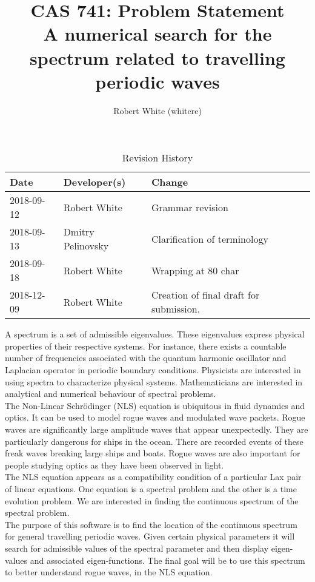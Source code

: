 \documentclass{article}
\title{CAS 741: Problem Statement\\A numerical search for the spectrum related
to travelling periodic waves}
\author{Robert White (whitere)}
\date{}
\begin{document}
\maketitle
\begin{table}[hp]
\caption{Revision History} \label{TblRevisionHistory}
\begin{tabularx}{\textwidth}{llX}
\toprule
\textbf{Date} & \textbf{Developer(s)} & \textbf{Change}\\
\midrule
2018-09-12 & Robert White & Grammar revision \\
2018-09-13 & Dmitry Pelinovsky & Clarification of terminology\\ 
2018-09-18 & Robert White & Wrapping at 80 char \\ 
2018-12-09 & Robert White & Creation of final draft for submission. \\
\bottomrule
\end{tabularx}
\end{table}

A spectrum is a set of admissible eigenvalues. These eigenvalues express
physical properties of their respective systems. For instance, there exists a
countable number of frequencies associated with the quantum harmonic oscillator
and Laplacian operator in periodic boundary conditions. Physicists are
interested in using spectra to characterize physical systems. Mathematicians 
are interested in analytical and numerical behaviour of spectral problems.\\

The Non-Linear Schr\"{o}dinger (NLS) equation is ubiquitous in fluid dynamics 
and optics. It can be used to model rogue waves and modulated wave packets. 
Rogue waves are significantly large amplitude waves that appear unexpectedly. 
They are particularly dangerous for ships in the ocean. There are recorded 
events of these freak waves breaking large ships and boats. Rogue waves are 
also important for people studying optics as they have been observed in light. 
\\

The NLS equation appears as a compatibility condition of a particular Lax pair
of linear equations. One equation is a spectral problem and the other is a time
evolution problem. We are interested in finding the continuous spectrum of the
spectral problem. \\

The purpose of this software is to find the location of the continuous spectrum
for general travelling periodic waves. Given certain physical parameters it 
will search for admissible values of the spectral parameter and then display
eigen-values and associated eigen-functions. The final goal will be to use this
spectrum to better understand rogue waves, in the NLS equation.  \\ 
\end{document}
